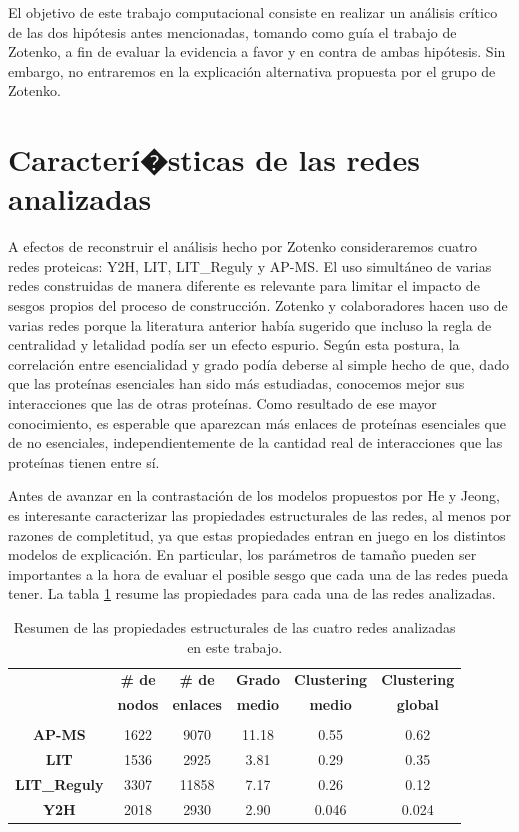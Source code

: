 \documentclass[%
 reprint,
 amsmath,amssymb,
 aps,
]{revtex4-1}
\begin{document}
El objetivo de este trabajo computacional consiste en realizar un an\'alisis cr\'itico de las dos hip\'otesis antes mencionadas, tomando como gu\'ia el trabajo de Zotenko, a fin de evaluar la evidencia a favor y en contra de ambas hip\'otesis. Sin embargo, no entraremos en la explicaci\'on alternativa propuesta por el grupo de Zotenko.


\section{Caracter\'i�sticas de las redes analizadas}

A efectos de reconstruir el an\'alisis hecho por Zotenko consideraremos cuatro redes proteicas: Y2H, LIT, LIT\_Reguly y AP-MS. El uso simult\'aneo de varias redes construidas de manera diferente es relevante para limitar el impacto de sesgos propios del proceso de construcci\'on. Zotenko y colaboradores hacen uso de varias redes porque la literatura anterior hab\'ia sugerido que incluso la regla de centralidad y letalidad pod\'ia ser un efecto espurio. Seg\'un esta postura, la correlaci\'on entre esencialidad y grado pod\'ia deberse al simple hecho de que, dado que las prote\'inas esenciales han sido m\'as estudiadas, conocemos mejor sus interacciones que las de otras prote\'inas. Como resultado de ese mayor conocimiento, es esperable que aparezcan m\'as enlaces de prote\'inas esenciales que de no esenciales, independientemente de la cantidad real de interacciones que las prote\'inas tienen entre s\'i.  

Antes de avanzar en la contrastaci\'on de los modelos propuestos por He y Jeong, es interesante caracterizar las propiedades estructurales de las redes, al menos por razones de completitud, ya que estas propiedades entran en juego en los distintos modelos de explicaci\'on. En particular, los par\'ametros de tama\~no pueden ser importantes a la hora de evaluar el posible sesgo que cada una de las redes pueda tener.  La tabla \ref{tabla1} resume las propiedades para cada una de las redes analizadas. 


\begin{table}[h]
\begin{ruledtabular}

\begin{tabular}{c c c c c c }
{}&{\bf \# de }&{\bf \# de }&{\bf Grado }&{\bf Clustering  }&{\bf Clustering }\\
{}&{\bf nodos}&{\bf enlaces}&{\bf medio}&{\bf medio }&{\bf  global}\\\hline\\
{\bf AP-MS}      &{1622}&{9070}&{11.18}&{0.55}&{0.62}\\
{\bf LIT}        &{1536}&{2925}&{3.81}&{0.29}&{0.35}\\
{\bf LIT\_Reguly} &{3307}&{11858}&{7.17}&{0.26}&{0.12}\\
{\bf Y2H}        &{2018}&{2930}&{2.90}&{0.046}&{0.024}\\ 
\end{tabular}
\end{ruledtabular}
\label{tabla1}
\caption{Resumen de las propiedades estructurales de las cuatro redes analizadas en este trabajo.}
\end{table}
\end{document}
